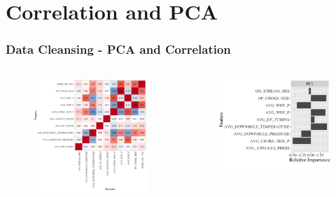 \documentclass[xcolor=table]{beamer}
\begin{document}
\section{Correlation and PCA}

\begin{frame}
\frametitle{Data Cleansing - PCA and Correlation}


\begin{columns}[c]

\begin{figure}
\includegraphics[width=1\linewidth,left]{corr_all.png} 
\end{figure}

\begin{figure}
\includegraphics[width=1\linewidth, right]{pca_all.png}
\end{figure}
\end{columns}

\end{frame}
\end{document}
